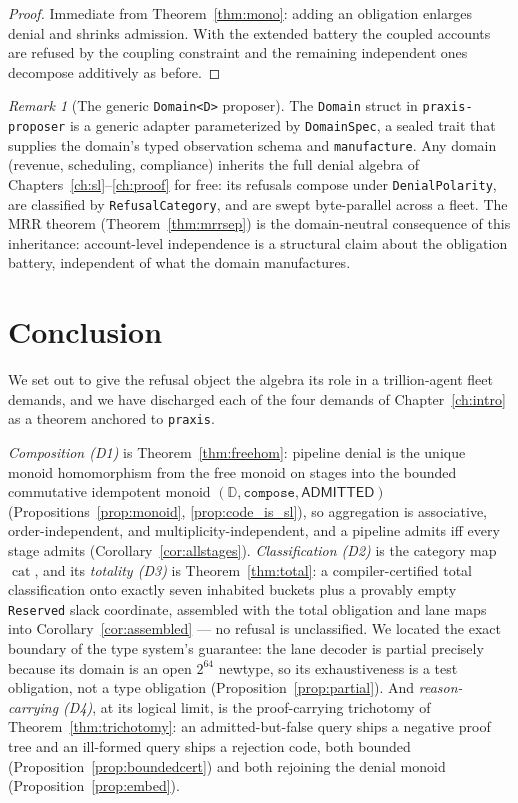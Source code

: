 \documentclass[11pt,oneside]{book}
\theoremstyle{definition}
\theoremstyle{plain}
\theoremstyle{remark}
\newtheorem*{remark}{Remark}
\newcommand{\code}[1]{\texttt{#1}}
\newcommand{\Deny}{\mathbb{D}}                 %
\newcommand{\Adml}{\mathsf{ADMITTED}}          %
\DeclareMathOperator{\catop}{cat}
\begin{document}
\begin{proof}
Immediate from Theorem~\ref{thm:mono}: adding an obligation enlarges denial and shrinks
admission. With the extended battery the coupled accounts are refused by the coupling
constraint and the remaining independent ones decompose additively as before.
\end{proof}

\begin{remark}[The generic \code{Domain<D>} proposer]
The \code{Domain} struct in \code{praxis-proposer} is a generic adapter parameterized by
\code{DomainSpec}, a sealed trait that supplies the domain's typed observation schema and
\code{manufacture}. Any domain (revenue, scheduling, compliance) inherits the full denial
algebra of Chapters~\ref{ch:sl}--\ref{ch:proof} for free: its refusals compose under
\code{DenialPolarity}, are classified by \code{RefusalCategory}, and are swept byte-parallel
across a fleet. The MRR theorem (Theorem~\ref{thm:mrrsep}) is the domain-neutral
consequence of this inheritance: account-level independence is a structural claim about the
obligation battery, independent of what the domain manufactures.
\end{remark}

\chapter{Conclusion}
\label{ch:concl}

We set out to give the refusal object the algebra its role in a trillion-agent fleet demands,
and we have discharged each of the four demands of Chapter~\ref{ch:intro} as a theorem anchored
to \code{praxis}.

\emph{Composition (D1)} is Theorem~\ref{thm:freehom}: pipeline denial is the unique monoid
homomorphism from the free monoid on stages into the bounded commutative idempotent monoid
$(\Deny,\code{compose},\Adml)$ (Propositions~\ref{prop:monoid}, \ref{prop:code_is_sl}), so
aggregation is associative, order-independent, and multiplicity-independent, and a pipeline
admits iff every stage admits (Corollary~\ref{cor:allstages}). \emph{Classification (D2)} is the
category map $\catop$, and its \emph{totality (D3)} is Theorem~\ref{thm:total}: a
compiler-certified total classification onto exactly seven inhabited buckets plus a provably
empty \code{Reserved} slack coordinate, assembled with the total obligation and lane maps into
Corollary~\ref{cor:assembled} --- no refusal is unclassified. We located the exact boundary of
the type system's guarantee: the lane decoder is partial precisely because its domain is an
open $2^{64}$ newtype, so its exhaustiveness is a test obligation, not a type obligation
(Proposition~\ref{prop:partial}). And \emph{reason-carrying (D4)}, at its logical limit, is the
proof-carrying trichotomy of Theorem~\ref{thm:trichotomy}: an admitted-but-false query ships a
negative proof tree and an ill-formed query ships a rejection code, both bounded
(Proposition~\ref{prop:boundedcert}) and both rejoining the denial monoid
(Proposition~\ref{prop:embed}).
\end{document}
